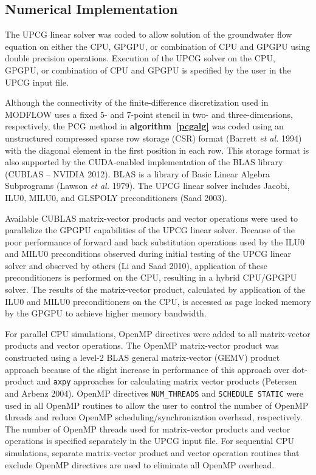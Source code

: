 \documentclass[12pt]{article}
\begin{document}
\subsection*{Numerical Implementation}
The UPCG linear solver was coded to allow solution of the groundwater flow equation on either the CPU, GPGPU, or combination of CPU and GPGPU using double precision operations. Execution of the UPCG solver on the CPU, GPGPU, or combination of CPU and GPGPU is specified by the user in the UPCG input file.

Although the connectivity of the finite-difference discretization used in MODFLOW uses a fixed 5- and 7-point stencil in two- and three-dimensions, respectively, the PCG method in \textbf{algorithm~\ref{pcgalg}} was coded using an unstructured compressed sparse row storage (CSR) format  (Barrett \textit{et al.} 1994) with the diagonal element in the first position in each row. This storage format is also supported by the \color{blue}CUDA-enabled implementation of the BLAS library (CUBLAS -- NVIDIA 2012). BLAS is a library of Basic Linear Algebra Subprograms (Lawson \textit{et al.} 1979)\color{black}. The UPCG linear solver includes Jacobi, ILU0, MILU0, and GLSPOLY preconditioners (\color{cyan}Saad \color{black}2003).

Available CUBLAS matrix-vector products and vector operations were used to parallelize the GPGPU capabilities of the UPCG linear solver. Because of the poor performance of forward and back substitution operations used by the ILU0 and MILU0 preconditions observed during initial testing of the UPCG linear solver and observed by others (Li and Saad 2010), application of these preconditioners is performed on the CPU, resulting in a hybrid CPU/GPGPU solver. The results of the matrix-vector product, calculated by application of the ILU0 and MILU0 preconditioners on the CPU, is accessed as page locked memory by the GPGPU to achieve higher memory bandwidth.

For parallel CPU simulations, OpenMP directives were added to all matrix-vector products and vector operations. The OpenMP matrix-vector product was constructed using a level-2 BLAS \color{cyan}general matrix-vector (GEMV) product \color{black}approach because of the slight increase in performance of this approach over dot-product and \texttt{axpy} approaches for calculating matrix vector products (Petersen and Arbenz 2004). OpenMP directives \texttt{NUM\_THREADS} and \texttt{SCHEDULE STATIC} were used in all OpenMP routines to allow the user to control the number of OpenMP threads and reduce OpenMP scheduling/synchronization overhead, respectively. The number of OpenMP threads used for matrix-vector products and vector operations is specified separately in the UPCG input file. For sequential CPU simulations, separate matrix-vector product and vector operation routines that exclude OpenMP directives are used to eliminate all OpenMP overhead.
\end{document}
